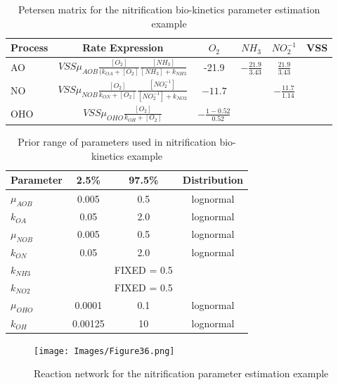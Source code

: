 \begin{table}[]
    \centering
    \begin{tabular}{l|c |c c c c}
       Process & Rate Expression & $O_2$ & $NH_3$ & $NO_2^{-1}$ & VSS  \\
    \hline
        AO & $VSS \mu_{AOB} \frac{[O_2]}{(k_{OA} + [O_2]}\frac{[NH_3]}{[NH_3]+k_{NH3}}$ & -21.9 & $-\frac{21.9}{3.43}$ & $\frac{21.9}{3.43}$ &   \\
        NO & $VSS \mu_{NOB} \frac{[O_2]}{k_{ON} + [O_2]}\frac{[NO_2^{-1}]}{[NO_2^{-1}]+k_{NO2}}$ & $-11.7$ &  & $-\frac{11.7}{1.14}$ &   \\
        OHO & $VSS \mu_{OHO} \frac{[O_2]}{k_{OH}+[O_2]}$ & $-\frac{1-0.52}{0.52}$ & & &  \\
    \end{tabular}
    \caption{Petersen matrix for the nitrification bio-kinetics parameter estimation example}
    \label{table:inverse_example3}
\end{table}

\begin{table}[]
    \centering
    \begin{tabular}{l|c c c}
       Parameter & 2.5\% & 97.5\% & Distribution  \\
    \hline
        $\mu_{AOB}$ & 0.005 & 0.5 & lognormal \\
        $k_{OA}$ & 0.05 & 2.0 & lognormal \\
        $\mu_{NOB}$ & 0.005 & 0.5 & lognormal \\
        $k_{ON}$ & 0.05 & 2.0 & lognormal \\
        $k_{NH3}$ & & FIXED = 0.5 & \\
        $k_{NO2}$ & & FIXED = 0.5 & \\
        $\mu_{OHO}$ & 0.0001 & 0.1 & lognormal \\
        $k_{OH}$ & 0.00125 & 10 & lognormal \\
    \end{tabular}
    \caption{Prior range of parameters used in nitrification bio-kinetics example}
    \label{table:inverse_example4}
\end{table}

\begin{figure}[!ht]
\begin{center}
\texttt{[image: Images/Figure36.png]} \\
\caption{Reaction network for the nitrification parameter estimation example}\label{fig:inverse_example2}
\end{center}
\end{figure}    


